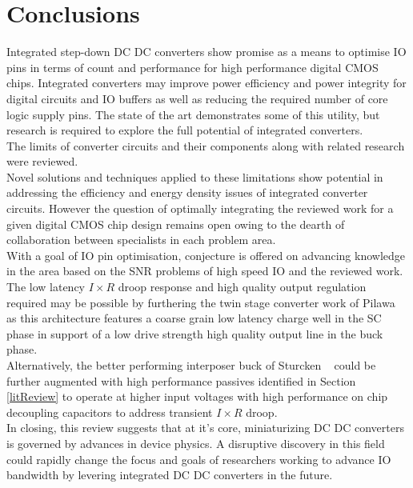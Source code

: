 \documentclass[letterpaper,twocolumn,10pt]{article}
\begin{document}
\section{Conclusions}

Integrated step-down DC DC converters show promise as a means to optimise IO pins in terms of count and performance for high performance digital CMOS chips. Integrated converters may improve power efficiency and power integrity for digital circuits and IO buffers as well as reducing the required number of core logic supply pins. The state of the art demonstrates some of this utility, but research is required to explore the full potential of integrated converters.\\  
The limits of converter circuits and their components along with related research were reviewed.\\
Novel solutions and techniques applied to these limitations show potential in addressing the efficiency and energy density issues of integrated converter circuits. However the question of optimally integrating the reviewed work for a given digital CMOS chip design remains open owing to the dearth of collaboration between specialists in each problem area.\\
\indent With a goal of IO pin optimisation, conjecture is offered on advancing knowledge in the area based on the SNR problems of high speed IO and the reviewed work. The low latency $I \times R$ droop response and high quality output regulation required may be possible by furthering the twin stage converter work of Pilawa~\cite{Pilawa2012} as this architecture features a coarse grain low latency charge well in the SC phase in support of a low drive strength high quality output line in the buck phase.\\
Alternatively, the better performing interposer buck of Sturcken ~\cite{Sturcken2013} could be further augmented with high performance passives identified in Section \ref{litReview} to operate at higher input voltages with high performance on chip decoupling capacitors to address transient $I \times R$ droop.\\
In closing, this review suggests that at it's core, miniaturizing DC DC converters is governed by advances in device physics. A disruptive discovery in this field could rapidly change the focus and goals of researchers working to advance IO bandwidth by levering integrated DC DC converters in the future.      


{\footnotesize 
}
\end{document}
